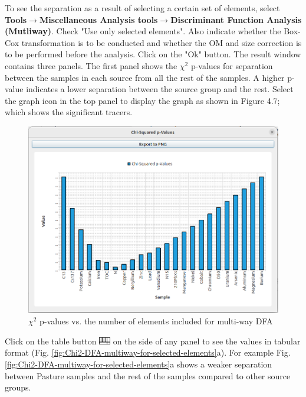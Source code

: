 \documentclass[12pt]{report}
\begin{document}
To see the separation as a result of selecting a certain set of elements, select \textbf{Tools}$\rightarrow$\textbf{Miscellaneous Analysis tools}$\rightarrow$\textbf{Discriminant Function Analysis (Mutliway)}. Check "Use only selected elements". Also indicate whether the Box-Cox transformation is to be conducted and whether the OM and size correction is to be performed before the analysis. Click on the "Ok" button. The result window contains three panels. The first panel shows the $\chi^2$ p-values for separation between the samples in each source from all the rest of the samples. A higher p-value indicates a lower separation between the source group and the rest.
Select the graph icon in the top panel to display the graph as shown in Figure 4.7; which shows the significant tracers.
\begin{figure}[ht]
    \centering
    \includegraphics[width=14cm]{Figures/Chi2p-value-stepwise-multiway-DFA.png}
    \caption{$\chi^2$ p-values vs. the number of elements included for multi-way DFA}
    \label{fig:Chi2-DFA-multiway}
\end{figure}
\FloatBarrier

 Click on the table button \includegraphics[width=0.5cm]{Figures/table.png} on the side of any panel to see the values in tabular format (Fig. \ref{fig:Chi2-DFA-multiway-for-selected-elements}a). For example Fig. \ref{fig:Chi2-DFA-multiway-for-selected-elements}a shows a weaker separation between Pasture samples and the rest of the samples compared to other source groups. 
\end{document}
